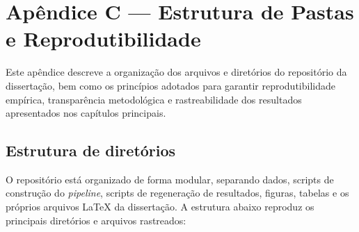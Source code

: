 \chapter{Apêndice C — Estrutura de Pastas e Reprodutibilidade}
\label{apendiceC}

Este apêndice descreve a organização dos arquivos e diretórios do repositório da
dissertação, bem como os princípios adotados para garantir reprodutibilidade
empírica, transparência metodológica e rastreabilidade dos resultados
apresentados nos capítulos principais.

\section{Estrutura de diretórios}

O repositório está organizado de forma modular, separando dados, scripts de
construção do \textit{pipeline}, scripts de regeneração de resultados, figuras,
tabelas e os próprios arquivos \LaTeX{} da dissertação. A estrutura abaixo
reproduz os principais diretórios e arquivos rastreados:

